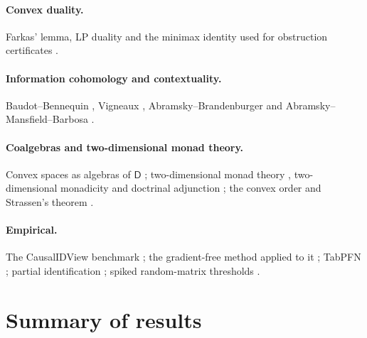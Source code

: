 \documentclass[11pt]{article}
\theoremstyle{definition}
\theoremstyle{remark}
\newcommand{\D}{\mathsf{D}}
\begin{document}
\paragraph{Convex duality.} Farkas' lemma, LP duality and the minimax identity used for
obstruction certificates \cite{Schrijver1986}.
\paragraph{Information cohomology and contextuality.} Baudot--Bennequin \cite{BaudotBennequin2015},
Vigneaux \cite{Vigneaux2019}, Abramsky--Brandenburger \cite{AbramskyBrandenburger2011} and
Abramsky--Mansfield--Barbosa \cite{AbramskyMansfieldBarbosa2012}.
\paragraph{Coalgebras and two-dimensional monad theory.} Convex spaces as algebras of $\D$
\cite{Fritz2009}; two-dimensional monad theory \cite{BKP1989,Lack2002}, two-dimensional monadicity
\cite{Bourke2014} and doctrinal adjunction \cite{Kelly1974}; the convex order and Strassen's theorem
\cite{Strassen1965}.
\paragraph{Empirical.} The CausalIDView benchmark \cite{Jung2026}; the gradient-free method applied
to it \cite[Section~51]{Awasthi-ThreeLayers}; TabPFN \cite{Hollmann2023}; partial
identification \cite{Manski1990}; spiked random-matrix thresholds \cite{BBP2005}.

\section{Summary of results}
\end{document}

